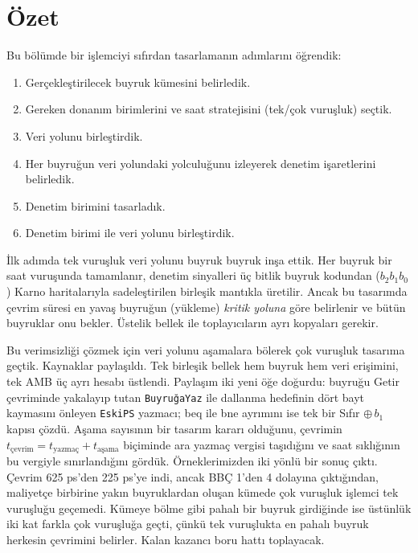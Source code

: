 
\section{Özet}
\label{sec:islemci-ozet}

Bu bölümde bir işlemciyi sıfırdan tasarlamanın adımlarını öğrendik:
\begin{enumerate}
    \item Gerçekleştirilecek buyruk kümesini belirledik.
    \item Gereken donanım birimlerini ve saat stratejisini (tek/çok vuruşluk) seçtik.
    \item Veri yolunu birleştirdik.
    \item Her buyruğun veri yolundaki yolculuğunu izleyerek denetim işaretlerini belirledik.
    \item Denetim birimini tasarladık.
    \item Denetim birimi ile veri yolunu birleştirdik.
\end{enumerate}

İlk adımda tek vuruşluk veri yolunu buyruk buyruk inşa ettik. Her buyruk bir saat vuruşunda tamamlanır, denetim sinyalleri üç bitlik buyruk kodundan ($b_2 b_1 b_0$) Karno haritalarıyla sadeleştirilen birleşik mantıkla üretilir. Ancak bu tasarımda çevrim süresi en yavaş buyruğun (yükleme) \emph{kritik yoluna} göre belirlenir ve bütün buyruklar onu bekler. Üstelik bellek ile toplayıcıların ayrı kopyaları gerekir.

Bu verimsizliği çözmek için veri yolunu aşamalara bölerek çok vuruşluk tasarıma geçtik. Kaynaklar paylaşıldı. Tek birleşik bellek hem buyruk hem veri erişimini, tek AMB üç ayrı hesabı üstlendi. Paylaşım iki yeni öğe doğurdu: buyruğu Getir çevriminde yakalayıp tutan \texttt{BuyruğaYaz} ile dallanma hedefinin dört bayt kaymasını önleyen \texttt{EskiPS} yazmacı; beq ile bne ayrımını ise tek bir Sıfır $\oplus\, b_1$ kapısı çözdü. Aşama sayısının bir tasarım kararı olduğunu, çevrimin $t_{\text{çevrim}} = t_{\text{yazmaç}} + t_{\text{aşama}}$ biçiminde ara yazmaç vergisi taşıdığını ve saat sıklığının bu vergiyle sınırlandığını gördük. Örneklerimizden iki yönlü bir sonuç çıktı. Çevrim 625 ps'den 225 ps'ye indi, ancak BBÇ 1'den 4 dolayına çıktığından, maliyetçe birbirine yakın buyruklardan oluşan kümede çok vuruşluk işlemci tek vuruşluğu geçemedi. Kümeye bölme gibi pahalı bir buyruk girdiğinde ise üstünlük iki kat farkla çok vuruşluğa geçti, çünkü tek vuruşlukta en pahalı buyruk herkesin çevrimini belirler. Kalan kazancı boru hattı toplayacak.


